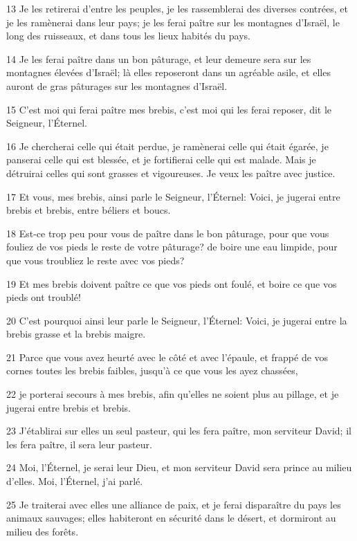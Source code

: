 \par 13 Je les retirerai d'entre les peuples, je les rassemblerai des diverses contrées, et je les ramènerai dans leur pays; je les ferai paître sur les montagnes d'Israël, le long des ruisseaux, et dans tous les lieux habités du pays.
\par 14 Je les ferai paître dans un bon pâturage, et leur demeure sera sur les montagnes élevées d'Israël; là elles reposeront dans un agréable asile, et elles auront de gras pâturages sur les montagnes d'Israël.
\par 15 C'est moi qui ferai paître mes brebis, c'est moi qui les ferai reposer, dit le Seigneur, l'Éternel.
\par 16 Je chercherai celle qui était perdue, je ramènerai celle qui était égarée, je panserai celle qui est blessée, et je fortifierai celle qui est malade. Mais je détruirai celles qui sont grasses et vigoureuses. Je veux les paître avec justice.
\par 17 Et vous, mes brebis, ainsi parle le Seigneur, l'Éternel: Voici, je jugerai entre brebis et brebis, entre béliers et boucs.
\par 18 Est-ce trop peu pour vous de paître dans le bon pâturage, pour que vous fouliez de vos pieds le reste de votre pâturage? de boire une eau limpide, pour que vous troubliez le reste avec vos pieds?
\par 19 Et mes brebis doivent paître ce que vos pieds ont foulé, et boire ce que vos pieds ont troublé!
\par 20 C'est pourquoi ainsi leur parle le Seigneur, l'Éternel: Voici, je jugerai entre la brebis grasse et la brebis maigre.
\par 21 Parce que vous avez heurté avec le côté et avec l'épaule, et frappé de vos cornes toutes les brebis faibles, jusqu'à ce que vous les ayez chassées,
\par 22 je porterai secours à mes brebis, afin qu'elles ne soient plus au pillage, et je jugerai entre brebis et brebis.
\par 23 J'établirai sur elles un seul pasteur, qui les fera paître, mon serviteur David; il les fera paître, il sera leur pasteur.
\par 24 Moi, l'Éternel, je serai leur Dieu, et mon serviteur David sera prince au milieu d'elles. Moi, l'Éternel, j'ai parlé.
\par 25 Je traiterai avec elles une alliance de paix, et je ferai disparaître du pays les animaux sauvages; elles habiteront en sécurité dans le désert, et dormiront au milieu des forêts.
